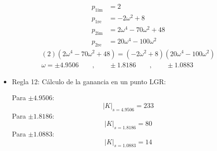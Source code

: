 \begin{itemize}
  \begin{align*}
    p_{1\text{im}} &=2
    \\
    p_{1\text{re}} &=-2\omega^2+8
    \\
    p_{2\text{im}} &=2\omega^4 -70\omega^2 + 48
    \\
    p_{2\text{re}} &=20\omega^4 - 100 \omega^2
  \end{align*}
  \begin{align*}
    (2)(2\omega^4 -70\omega^2 + 48) = (-2\omega^2+8)(20\omega^4 - 100 \omega^2)
    \\
    \omega = \pm4.9506 \qquad, \qquad \pm 1.8186 \qquad, \qquad \pm 1.0883
  \end{align*}

  \item Regla 12: Cálculo de la ganancia en un punto LGR:
  
  Para $\pm4.9506$:
    \begin{equation*}
    |K|_{s=4.9506} = 233
  \end{equation*}
    Para $\pm1.8186$:
    \begin{equation*}
    |K|_{s=1.8186} = 80
  \end{equation*}
    Para $\pm1.0883$:
    \begin{equation*}
    |K|_{s=1.0883} = 14
  \end{equation*}

\end{itemize}

